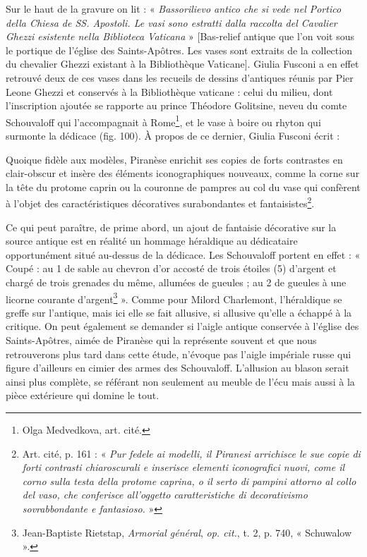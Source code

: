 \documentclass[12pt,twoside,openany]{book}
\renewenvironment{quote}
  {%
    \par\begingroup
    \fontsize{11pt}{14pt}\selectfont
    \list{}{\leftmargin=1.5em\rightmargin=1.5em}%
    \item\relax
  }
  {%
    \endlist
    \endgroup
  }
\newenvironment{PurhBlockQuote}
  {%
    \begin{quote}
  }
  {%
    \end{quote}
  }
\begin{document}
Sur le haut de la gravure on lit : « \textit{Bassorilievo antico che si vede nel Portico della Chiesa de SS. Apostoli. Le vasi sono estratti dalla raccolta del Cavalier Ghezzi esistente nella Biblioteca Vaticana} » [Bas-relief antique que l’on voit sous le portique de l’église des Saints-Apôtres. Les vases sont extraits de la collection du chevalier Ghezzi existant à la Bibliothèque Vaticane]. Giulia Fusconi a en effet retrouvé deux de ces vases dans les recueils de dessins d’antiques réunis par Pier Leone Ghezzi et conservés à la Bibliothèque vaticane : celui du milieu, dont l’inscription ajoutée se rapporte au prince Théodore Golitsine, neveu du comte Schouvaloff qui l’accompagnait à Rome\footnote{Olga Medvedkova, art. cité.}, et le vase à boire ou rhyton qui surmonte la dédicace (fig. 100). À propos de ce dernier, Giulia Fusconi écrit :

\begin{PurhBlockQuote}
Quoique fidèle aux modèles, Piranèse enrichit ses copies de forts contrastes en clair-obscur et insère des éléments iconographiques nouveaux, comme la corne sur la tête du protome caprin ou la couronne de pampres au col du vase qui confèrent à l’objet des caractéristiques décoratives surabondantes et fantaisistes\footnote{Art. cité, p. 161 : « \textit{Pur fedele ai modelli, il Piranesi arrichisce le sue copie di forti contrasti chiaroscurali e inserisce elementi iconografici nuovi, come il corno sulla testa della protome caprina, o il serto di pampini attorno al collo del vaso, che conferisce all’oggetto caratteristiche di decorativismo sovrabbondante e fantasioso.} »}.
\end{PurhBlockQuote}

Ce qui peut paraître, de prime abord, un ajout de fantaisie décorative sur la source antique est en réalité un hommage héraldique au dédicataire opportunément situé au-dessus de la dédicace. Les Schouvaloff portent en effet : « Coupé : au 1 de sable au chevron d’or accosté de trois étoiles (5) d’argent et chargé de trois grenades du même, allumées de gueules ; au 2 de gueules à une licorne courante d’argent\footnote{Jean-Baptiste Rietstap, \textit{Armorial général},\textit{ op. cit.}, t. 2, p. 740, « Schuwalow ».} ». Comme pour Milord Charlemont, l’héraldique se greffe sur l’antique, mais ici elle se fait allusive, si allusive qu’elle a échappé à la critique. On peut également se demander si l’aigle antique conservée à l’église des Saints-Apôtres, aimée de Piranèse qui la représente souvent et que nous retrouverons plus tard dans cette étude, n’évoque pas l’aigle impériale russe qui figure d’ailleurs en cimier des armes des Schouvaloff. L’allusion au blason serait ainsi plus complète, se référant non seulement au meuble de l’écu mais aussi à la pièce extérieure qui domine le tout.
\end{document}
